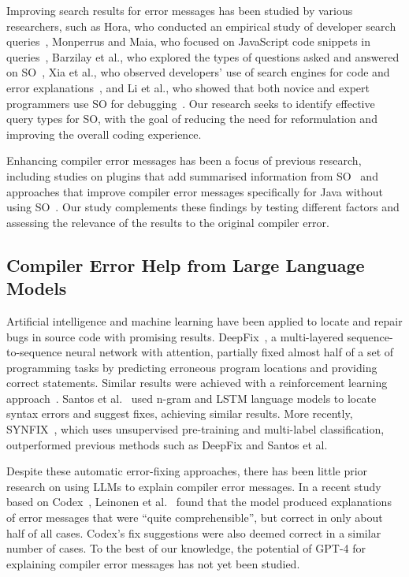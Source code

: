 \documentclass[preprint,12pt]{elsarticle}
\begin{document}
Improving search results for error messages has been studied by various researchers, such as Hora, who conducted an empirical study of developer search queries~\cite{r10}, Monperrus and Maia, who focused on JavaScript code snippets in queries~\cite{r17}, Barzilay et al., who explored the types of questions asked and answered on SO~\cite{r8}, Xia et al., who observed developers' use of search engines for code and error explanations~\cite{r2}, and Li et al., who showed that both novice and expert programmers use SO for debugging~\cite{r6}. Our research seeks to identify effective query types for SO, with the goal of reducing the need for reformulation and improving the overall coding experience.

Enhancing compiler error messages has been a focus of previous research, including studies on plugins that add summarised information from SO~\cite{t6, r21} and approaches that improve compiler error messages specifically for Java without using SO~\cite{r22, r23, r24}. Our study complements these findings by testing different factors and assessing the relevance of the results to the original compiler error.

\subsection{Compiler Error Help from Large Language Models}

Artificial intelligence and machine learning have been applied to locate and repair bugs in source code with promising results. DeepFix~\cite{gupta2017deepfix}, a multi-layered sequence-to-sequence neural network with attention, partially fixed almost half of a set of programming tasks by predicting erroneous program locations and providing correct statements. Similar results were achieved with a reinforcement learning approach~\cite{gupta2019deep}. Santos et al.~\cite{santos2018syntax} used n-gram and LSTM language models to locate syntax errors and suggest fixes, achieving similar results. More recently, SYNFIX~\cite{ahmed2021synfix}, which uses unsupervised pre-training and multi-label classification, outperformed previous methods such as DeepFix and Santos et al.

Despite these automatic error-fixing approaches, there has been little prior research on using LLMs to explain compiler error messages. In a recent study based on Codex~\cite{chen2021evaluating}, Leinonen et al.~\cite{leinonen2022using} found that the model produced explanations of error messages that were ``quite comprehensible'', but correct in only about half of all cases. Codex's fix suggestions were also deemed correct in a similar number of cases. To the best of our knowledge, the potential of GPT-4 for explaining compiler error messages has not yet been studied.
\end{document}
